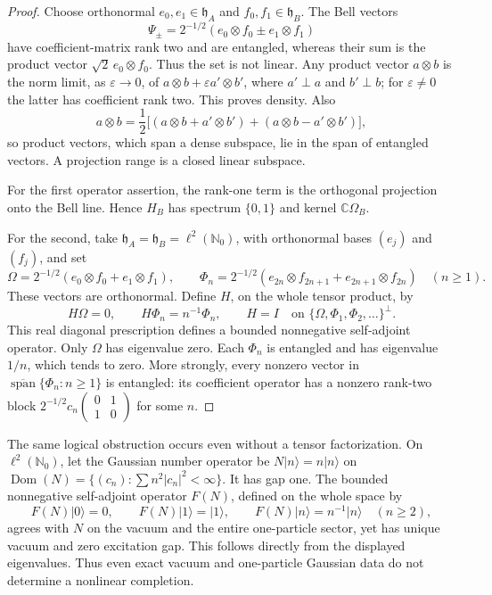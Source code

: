\documentclass[11pt]{article}
\theoremstyle{definition}
\numberwithin{equation}{section}
\begin{document}
\begin{proof}
Choose orthonormal \(e_0,e_1\in\mathfrak h_A\) and
\(f_0,f_1\in\mathfrak h_B\).  The Bell vectors
\[
 \Psi_\pm=2^{-1/2}(e_0\otimes f_0\pm e_1\otimes f_1)
\]
have coefficient-matrix rank two and are entangled, whereas their sum is the
product vector \(\sqrt2\,e_0\otimes f_0\).  Thus the set is not linear.  Any
product vector \(a\otimes b\) is the norm limit, as \(\varepsilon\to0\), of
\(a\otimes b+\varepsilon a'\otimes b'\), where \(a'\perp a\) and
\(b'\perp b\); for \(\varepsilon\ne0\) the latter has coefficient rank two.
This proves density.  Also
\[
 a\otimes b=\frac12\bigl[(a\otimes b+a'\otimes b')
                         +(a\otimes b-a'\otimes b')\bigr],
\]
so product vectors, which span a dense subspace, lie in the span of entangled
vectors.  A projection range is a closed linear subspace.

For the first operator assertion, the rank-one term is the orthogonal
projection onto the Bell line.  Hence \(H_B\) has spectrum \(\{0,1\}\) and
kernel \(\mathbb C\Omega_B\).

For the second, take
\(\mathfrak h_A=\mathfrak h_B=\ell^2(\mathbb N_0)\), with orthonormal bases
\((e_j)\) and \((f_j)\), and set
\[
 \Omega=2^{-1/2}(e_0\otimes f_0+e_1\otimes f_1),
 \qquad
 \Phi_n=2^{-1/2}(e_{2n}\otimes f_{2n+1}
                         +e_{2n+1}\otimes f_{2n})\quad(n\ge1).
\]
These vectors are orthonormal.  Define \(H\), on the whole tensor product, by
\begin{equation}
 H\Omega=0,
 \qquad H\Phi_n=n^{-1}\Phi_n,
 \qquad H=I\quad\text{on }
 \{\Omega,\Phi_1,\Phi_2,\ldots\}^{\perp}.
 \label{cusp-link-entangled-gapless-operator}
\end{equation}
This real diagonal prescription defines a bounded nonnegative self-adjoint
operator.  Only \(\Omega\) has eigenvalue zero.  Each \(\Phi_n\) is entangled
and has eigenvalue \(1/n\), which tends to zero.  More strongly, every
nonzero vector in
\(\overline{\operatorname{span}}\{\Phi_n:n\ge1\}\) is entangled: its
coefficient operator has a nonzero rank-two block
\(2^{-1/2}c_n\left(\begin{smallmatrix}0&1\\1&0\end{smallmatrix}\right)\)
for some \(n\).
\end{proof}

The same logical obstruction occurs even without a tensor factorization.
On \(\ell^2(\mathbb N_0)\), let the Gaussian number operator be
\(N|n\rangle=n|n\rangle\) on
\(\operatorname{Dom}(N)=\{(c_n):\sum n^2|c_n|^2<\infty\}\).  It has gap one.
The bounded nonnegative self-adjoint operator \(F(N)\), defined on the whole
space by
\begin{equation}
 F(N)|0\rangle=0,
 \qquad F(N)|1\rangle=|1\rangle,
 \qquad F(N)|n\rangle=n^{-1}|n\rangle\quad(n\ge2),
 \label{cusp-link-same-one-particle-gapless-completion}
\end{equation}
agrees with \(N\) on the vacuum and the entire one-particle sector, yet has
unique vacuum and zero excitation gap.  This follows directly from the
displayed eigenvalues.  Thus even exact vacuum and one-particle Gaussian data
do not determine a nonlinear completion.
\end{document}
